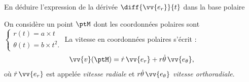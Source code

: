 
\begin{enonce}
	En déduire l'expression de la dérivée  $\diff{\vv{e_r}}{t}$ dans la base 
	polaire
\end{enonce}



\finEntrainement






\newpage





\hauteurLargeurCadreReponse		{8mm}{4cm}
\typeEntrainement				{} %
\initialisationEntrainement


On considère un point $\ptM$ dont les coordonnées polaires sont 
$\begin{cases}
	r(t) =a\times t\\
	\theta(t) = b\times t^2.
\end{cases}$
\newline
La vitesse en coordonnées polaires s'écrit : 
\[
\vv{v}(\ptM)=\dot{r} \, \vv{e_r}+ r\dot{\theta}\, \vv{e_\theta}, 
\]
où $\dot{r}\, \vv{e_r}$ est appelée \emph{vitesse radiale} et $r\dot{\theta}\, \vv{e_\theta}$  \emph{vitesse orthoradiale}. 

\debutEntrainement


